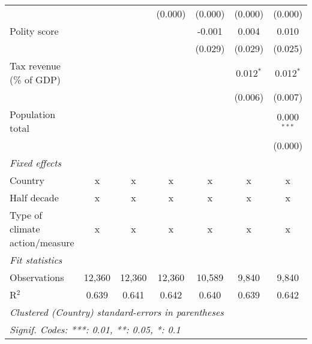 \begin{tabular}{lcccccc}
                                                                                     &               &               & (0.000)       & (0.000)       & (0.000)       & (0.000)\\   
   Polity score                                                                      &               &               &               & -0.001        & 0.004         & 0.010\\   
                                                                                     &               &               &               & (0.029)       & (0.029)       & (0.025)\\   
   Tax revenue (\% of GDP)                                                           &               &               &               &               & 0.012$^{*}$   & 0.012$^{*}$\\   
                                                                                     &               &               &               &               & (0.006)       & (0.007)\\   
   Population total                                                                  &               &               &               &               &               & 0.000$^{***}$\\   
                                                                                     &               &               &               &               &               & (0.000)\\   
   \emph{Fixed effects}\\
   Country                                                                           & x             & x             & x             & x             & x             & x\\  
   Half decade                                                                       & x             & x             & x             & x             & x             & x\\  
   Type of climate action/measure                                                    & x             & x             & x             & x             & x             & x\\  
   \midrule \emph{Fit statistics}\\
   Observations                                                                      & 12,360        & 12,360        & 12,360        & 10,589        & 9,840         & 9,840\\  
   R$^2$                                                                             & 0.639         & 0.641         & 0.642         & 0.640         & 0.639         & 0.642\\  
   \midrule
   \multicolumn{7}{l}{\emph{Clustered (Country) standard-errors in parentheses}}\\
   \multicolumn{7}{l}{\emph{Signif. Codes: ***: 0.01, **: 0.05, *: 0.1}}\\
\end{tabular}
\par\endgroup


